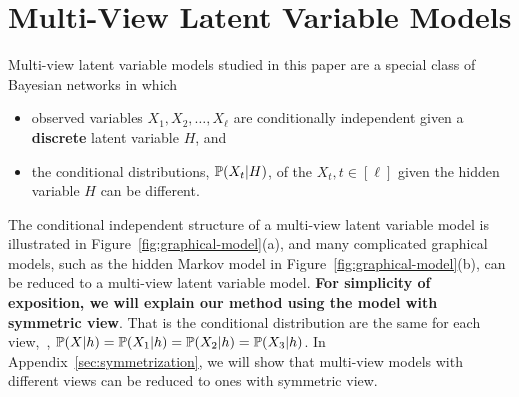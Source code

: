\documentclass{article}
\begin{document}
\section{Multi-View Latent Variable Models}

Multi-view latent variable models studied in this paper are a
special class of Bayesian networks in which
\begin{itemize}[noitemsep,nolistsep]
  \item observed variables $X_1, X_2, \ldots, X_\ell$ are conditionally independent given a {\bf discrete} latent variable $H$, and
	\item the conditional distributions, $\mathbb{P}(X_t|H)$, of the $X_t, t \in [\ell]$ given the hidden variable $H$ can be different.
\end{itemize}
The conditional independent structure of a multi-view latent variable model is illustrated in Figure~\ref{fig:graphical-model}(a), and many complicated graphical models, such as the hidden Markov model in Figure~\ref{fig:graphical-model}(b), can be reduced to a multi-view latent variable model. {\bf For simplicity of exposition, we will explain our method using the model with symmetric view}. That is the conditional distribution are the same for each view,~\ie, $\mathbb{P}(X|h) = \mathbb{P}(X_1|h) =  \mathbb{P}(X_2|h) =\mathbb{P}(X_3|h)$. In Appendix~\ref{sec:symmetrization}, we will show that multi-view models with different views can be reduced to ones with symmetric view.
\end{document}
